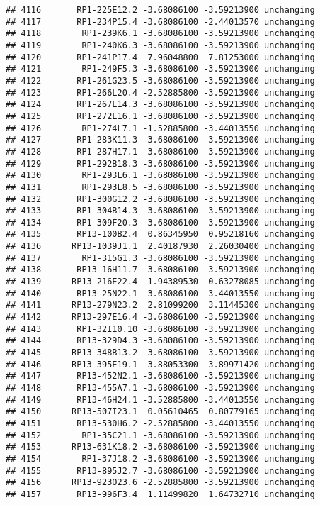 \documentclass[]{article}
\begin{document}
\begin{verbatim}
## 4116       RP1-225E12.2 -3.68086100 -3.59213900 unchanging
## 4117       RP1-234P15.4 -3.68086100 -2.44013570 unchanging
## 4118        RP1-239K6.1 -3.68086100 -3.59213900 unchanging
## 4119        RP1-240K6.3 -3.68086100 -3.59213900 unchanging
## 4120       RP1-241P17.4  7.96048800  7.81253000 unchanging
## 4121        RP1-249F5.3 -3.68086100 -3.59213900 unchanging
## 4122       RP1-261G23.5 -3.68086100 -3.59213900 unchanging
## 4123       RP1-266L20.4 -2.52885800 -3.59213900 unchanging
## 4124       RP1-267L14.3 -3.68086100 -3.59213900 unchanging
## 4125       RP1-272L16.1 -3.68086100 -3.59213900 unchanging
## 4126        RP1-274L7.1 -1.52885800 -3.44013550 unchanging
## 4127       RP1-283K11.3 -3.68086100 -3.59213900 unchanging
## 4128       RP1-287H17.1 -3.68086100 -3.59213900 unchanging
## 4129       RP1-292B18.3 -3.68086100 -3.59213900 unchanging
## 4130        RP1-293L6.1 -3.68086100 -3.59213900 unchanging
## 4131        RP1-293L8.5 -3.68086100 -3.59213900 unchanging
## 4132       RP1-300G12.2 -3.68086100 -3.59213900 unchanging
## 4133       RP1-304B14.3 -3.68086100 -3.59213900 unchanging
## 4134       RP1-309F20.3 -3.68086100 -3.59213900 unchanging
## 4135       RP13-100B2.4  0.86345950  0.95218160 unchanging
## 4136      RP13-1039J1.1  2.40187930  2.26030400 unchanging
## 4137        RP1-315G1.3 -3.68086100 -3.59213900 unchanging
## 4138       RP13-16H11.7 -3.68086100 -3.59213900 unchanging
## 4139      RP13-216E22.4 -1.94389530 -0.63278085 unchanging
## 4140       RP13-25N22.1 -3.68086100 -3.44013550 unchanging
## 4141      RP13-279N23.2  2.81099200  3.11445300 unchanging
## 4142      RP13-297E16.4 -3.68086100 -3.59213900 unchanging
## 4143       RP1-32I10.10 -3.68086100 -3.59213900 unchanging
## 4144       RP13-329D4.3 -3.68086100 -3.59213900 unchanging
## 4145      RP13-348B13.2 -3.68086100 -3.59213900 unchanging
## 4146      RP13-395E19.1  3.88053300  3.89971420 unchanging
## 4147       RP13-452N2.1 -3.68086100 -3.59213900 unchanging
## 4148       RP13-455A7.1 -3.68086100 -3.59213900 unchanging
## 4149       RP13-46H24.1 -3.52885800 -3.44013550 unchanging
## 4150      RP13-507I23.1  0.05610465  0.80779165 unchanging
## 4151       RP13-530H6.2 -2.52885800 -3.44013550 unchanging
## 4152        RP1-35C21.1 -3.68086100 -3.59213900 unchanging
## 4153      RP13-631K18.2 -3.68086100 -3.59213900 unchanging
## 4154        RP1-37J18.2 -3.68086100 -3.59213900 unchanging
## 4155       RP13-895J2.7 -3.68086100 -3.59213900 unchanging
## 4156      RP13-923O23.6 -2.52885800 -3.59213900 unchanging
## 4157       RP13-996F3.4  1.11499820  1.64732710 unchanging

\end{verbatim}
\end{document}
